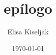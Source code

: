 \documentclass[a5paper,doc,12pt,apacite]{apa6}
\title{epílogo}
\author{Elisa Kiseljak}
\date{\today}
\begin{document}
\maketitle


\nocite{Bosch}


\end{document}
